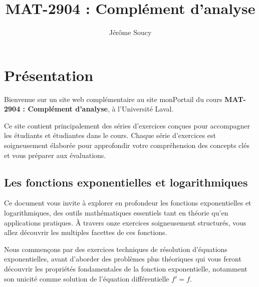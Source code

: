 \documentclass[
  12pt,
  letterpaper,
]{book}
\title{MAT-2904 : Complément d'analyse}
\author{Jérôme Soucy}
\date{}
\renewcommand*\contentsname{Table des matières}
\newcommand\contentsname{Table des matières}
\theoremstyle{remark}
\begin{document}
\frontmatter
\maketitle
\ifdefined\Shaded\renewenvironment{Shaded}{\begin{tcolorbox}[enhanced, sharp corners, boxrule=0pt, interior hidden, breakable, borderline west={3pt}{0pt}{shadecolor}, frame hidden]}{\end{tcolorbox}}\fi

\renewcommand*\contentsname{Table des matières}
{
\hypersetup{linkcolor=}
\setcounter{tocdepth}{2}
\tableofcontents
}
\listoffigures
\listoftables
\mainmatter
{}

\hypertarget{pruxe9sentation}{%
\chapter*{Présentation}\label{pruxe9sentation}}


Bienvenue sur un site web complémentaire au site monPortail du cours
\textbf{MAT-2904 : Complément d'analyse}, à l'Université Laval.

Ce site contient principalement des séries d'exercices conçues pour
accompagner les étudiants et étudiantes dans le cours. Chaque série
d'exercices est soigneusement élaborée pour approfondir votre
compréhension des concepts clés et vous préparer aux évaluations.

\hypertarget{les-fonctions-exponentielles-et-logarithmiques}{%
\section*{Les fonctions exponentielles et
logarithmiques}\label{les-fonctions-exponentielles-et-logarithmiques}}


Ce document vous invite à explorer en profondeur les fonctions
exponentielles et logarithmiques, des outils mathématiques essentiels
tant en théorie qu'en applications pratiques. À travers onze exercices
soigneusement structurés, vous allez découvrir les multiples facettes de
ces fonctions.

Nous commençons par des exercices techniques de résolution d'équations
exponentielles, avant d'aborder des problèmes plus théoriques qui vous
feront découvrir les propriétés fondamentales de la fonction
exponentielle, notamment son unicité comme solution de l'équation
différentielle \(f'=f\).
\end{document}
